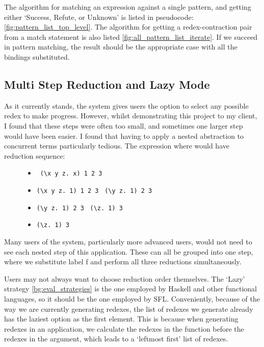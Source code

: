 The algorithm for matching an expression against a single pattern, and getting either `Success, Refute, or Unknown' is listed in pseudocode: \ref{fig:pattern_list_top_level}. The algorithm for getting a redex-contraction pair from a match statement is also listed \ref{fig:all_pattern_list_iterate}. If we succeed in pattern matching, the result should be the appropriate case with all  the bindings substituted. 

\subsection{Multi Step Reduction and Lazy Mode}
As it currently stands, the system gives users the option to select any possible redex to make progress. However, whilst demonstrating this project to my client, I found that these steps were often too small, and sometimes one larger step would have been easier. I found that having to apply a nested abstraction to concurrent terms particularly tedious. The expression  where  would have reduction sequence:
\begin{figure} %
\begin{itemize}
    \item {} \arr\ \verb|(\x y z. x) 1 2 3|
    \item \verb|(\x y z. 1) 1 2 3| \arr\ \verb|(\y z. 1) 2 3|
    \item \verb|(\y z. 1) 2 3| \arr\ \verb|(\z. 1) 3|
    \item \verb|(\z. 1) 3| \arr\ 
\end{itemize}
\end{figure}
\noindent Many users of the system, particularly more advanced users, would not need to see each nested step of this application. These can all be grouped into one step, where we substitute label f and perform all three reductions simultaneously. 


Users may not always want to choose reduction order themselves. The `Lazy' strategy \ref{bg:eval_strategies} is the one employed by Haskell and other functional languages, so it should be the one employed by \ac{SFL}. Conveniently, because of the way we are currently generating redexes, the list of redexes we generate already has the laziest option as the first element. This is because when generating redexes in an application, we calculate the redexes in the function before the redexes in the argument, which leads to a `leftmost first' list of redexes. 

